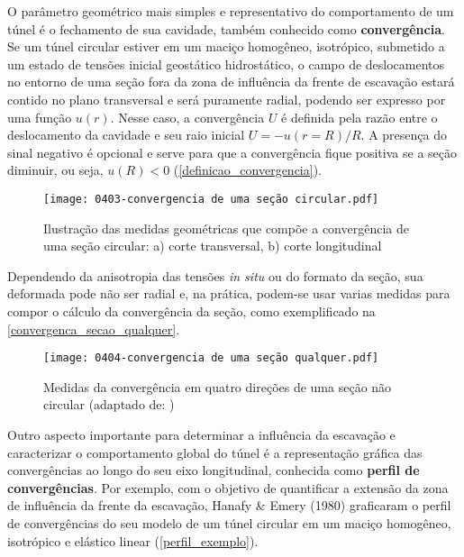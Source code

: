 O parâmetro geométrico mais simples e representativo do comportamento de um túnel é o fechamento de sua cavidade, também conhecido como \textbf{convergência}. Se um túnel circular estiver em um maciço homogêneo, isotrópico, submetido a um estado de tensões inicial geostático hidrostático, o campo de deslocamentos no entorno de uma seção fora da zona de influência da frente de escavação estará contido no plano transversal e será puramente radial, podendo ser expresso por uma função  $u(r)$. Nesse caso, a convergência $U$ é definida pela razão entre o deslocamento da cavidade e seu raio inicial $U=-u(r=R)/R$. A presença do sinal negativo é opcional e serve para que a convergência fique positiva se a seção diminuir, ou seja, $u(R) < 0$  (\autoref{definicao_convergencia}).

\begin{figure}[H]
	\begin{center}
		\texttt{[image: 0403-convergencia de uma seção circular.pdf]}
	\end{center}
	\caption{\label{definicao_convergencia}Ilustração das medidas geométricas que compõe a convergência de uma seção circular: a) corte transversal, b) corte longitudinal}
\end{figure}

Dependendo da anisotropia das tensões \textit{in situ} ou do formato da seção, sua deformada pode não ser radial e, na prática, podem-se usar varias medidas para compor o cálculo da convergência da seção, como exemplificado na \autoref{convergenca_secao_qualquer}.

\begin{figure}[H]
	\begin{center}
		\texttt{[image: 0404-convergencia de uma seção qualquer.pdf]}
	\end{center}
	\caption{\label{convergenca_secao_qualquer}Medidas da convergência em quatro direções de uma seção não circular (adaptado de: )}
\end{figure}

Outro aspecto importante para determinar a influência da escavação e caracterizar o comportamento global do túnel é a representação gráfica das convergências ao longo do seu eixo longitudinal, conhecida como \textbf{perfil de convergências}. Por exemplo, com o objetivo de quantificar a extensão da zona de influência da frente da escavação, Hanafy \& Emery (1980) graficaram o perfil de convergências do seu modelo de um túnel circular em um maciço homogêneo, isotrópico e elástico linear (\autoref{perfil_exemplo}).


